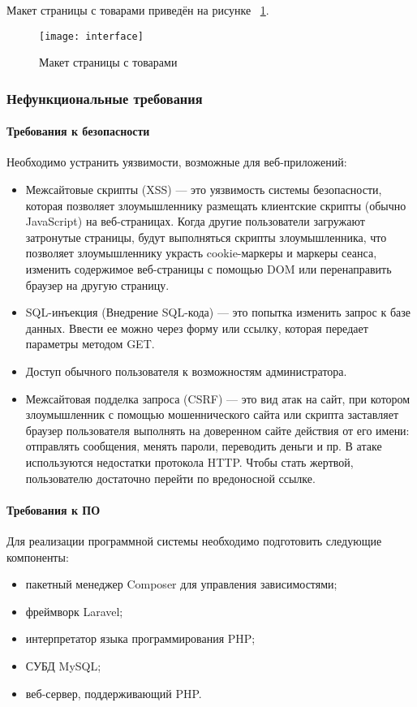Макет страницы с товарами приведён на рисунке ~\ref{interface:image}.

\begin{figure}[ht]
	\texttt{[image: interface]}
	\caption{Макет страницы с товарами}
	\label{interface:image}
\end{figure}

\subsubsection{Нефункциональные требования}

\paragraph{Требования к безопасности}
Необходимо устранить уязвимости, возможные для веб-приложений:
\begin{itemize}
	\item Межсайтовые скрипты (XSS) — это уязвимость системы безопасности, которая позволяет злоумышленнику размещать клиентские скрипты (обычно JavaScript) на веб-страницах. Когда другие пользователи загружают затронутые страницы, будут выполняться скрипты злоумышленника, что позволяет злоумышленнику украсть cookie-маркеры и маркеры сеанса, изменить содержимое веб-страницы с помощью DOM или перенаправить браузер на другую страницу.
	\item SQL-инъекция (Внедрение SQL-кода) — это попытка изменить запрос к базе данных. Ввести ее можно через форму или ссылку, которая передает параметры методом GET\cite{dronov}.
	\item Доступ обычного пользователя к возможностям администратора.
	\item Межсайтовая подделка запроса (CSRF) — это вид атак на сайт, при котором злоумышленник с помощью мошеннического сайта или скрипта заставляет браузер пользователя выполнять на доверенном сайте действия от его имени: отправлять сообщения, менять пароли, переводить деньги и пр. В атаке используются недостатки протокола HTTP. Чтобы стать жертвой, пользователю достаточно перейти по вредоносной ссылке.
\end{itemize}

\paragraph{Требования к ПО}
Для реализации программной системы необходимо подготовить следующие компоненты:
\begin{itemize}
	\item пакетный менеджер Composer для управления зависимостями;
	\item фреймворк Laravel;
	\item интерпретатор языка программирования PHP;
	\item СУБД MySQL;
	\item веб-сервер, поддерживающий PHP.
\end{itemize}

